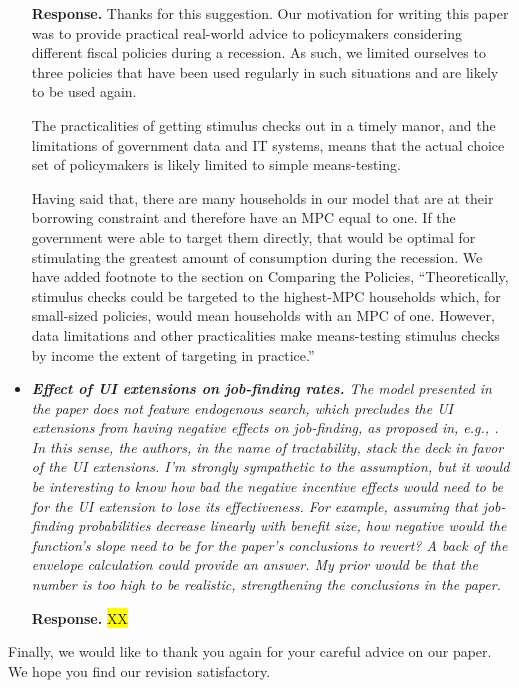 \documentclass[12pt,letterpaper,english]{article}
\begin{document}
\begin{itemize}
	\noindent \textbf{Response.} Thanks for this suggestion. Our motivation for writing this paper was to provide practical real-world advice to policymakers considering different fiscal policies during a recession. As such, we limited ourselves to three policies that have been used regularly in such situations and are likely to be used again. 
	
	The practicalities of getting stimulus checks out in a timely manor, and the limitations of government data and IT systems, means that the actual choice set of policymakers is likely limited to simple means-testing.
	
	Having said that, there are many households in our model that are at their borrowing constraint and therefore have an MPC equal to one. If the government were able to target them directly, that would be optimal for stimulating the greatest amount of consumption during the recession. We have added footnote to the section on Comparing the Policies, ``Theoretically, stimulus checks could be targeted to the highest-MPC households which, for small-sized policies, would mean households with an MPC of one. However, data limitations and other practicalities make means-testing stimulus checks by income the extent of targeting in practice.''
	
	
	\item \textit{\textbf{Effect of UI extensions on job-finding rates.} The model presented in the paper does not feature endogenous search, which precludes the UI extensions from having negative effects on job-finding, as proposed in, e.g., \citet{mitman2015optimal}. In this sense, the authors, in the name of tractability, stack the deck in favor of the UI extensions. I’m strongly sympathetic to the assumption, but it would be interesting to know how bad the negative incentive effects would need to be for the UI	extension to lose its effectiveness. For example, assuming that job-finding probabilities decrease linearly with benefit size, how negative would the function’s slope need to be for the	paper’s conclusions to revert? A back of the envelope calculation could provide an answer. My prior would be that the number is too high to be realistic, strengthening the conclusions in the paper.}
	
	\noindent \textbf{Response.} \colorbox{yellow}{XX}
	
\end{itemize}

\bigskip

\noindent Finally, we would like to thank you again for your careful advice on our paper. We hope you find our revision satisfactory.



\end{document}

